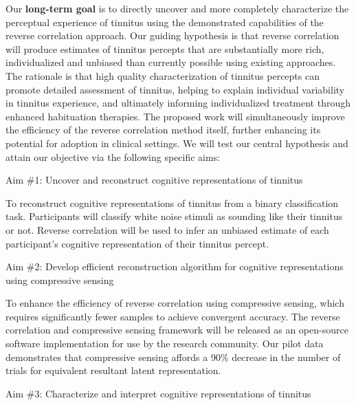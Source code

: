 \documentclass[11pt, notitlepage]{article} %
\begin{document}
Our \textbf{long-term goal} is to directly uncover and more completely characterize the perceptual experience of tinnitus using the demonstrated capabilities of the reverse correlation approach.
Our guiding hypothesis is that reverse correlation will produce estimates of tinnitus percepts that are substantially more rich, individualized and unbiased than currently possible using existing approaches. The rationale is that high quality characterization of tinnitus percepts can promote detailed assessment of tinnitus, helping to explain individual variability in tinnitus experience, and ultimately informing individualized treatment through enhanced habituation therapies. The proposed work will simultaneously improve the efficiency of the reverse correlation method itself, further enhancing its potential for adoption in clinical settings. We will test our central hypothesis and attain our objective via the following specific aims:

\begin{description}
	\item[Aim \#1: Uncover and reconstruct cognitive representations of tinnitus]{} 
\end{description}

To reconstruct cognitive representations of tinnitus from a binary classification task.
Participants will classify white noise stimuli as sounding like their tinnitus or not.
Reverse correlation will be used to infer an unbiased estimate of each participant's
cognitive representation of their tinnitus percept.

\begin{description}
	\item[Aim \#2: Develop efficient reconstruction algorithm for cognitive representations using compressive sensing]{} 
\end{description}

To enhance the efficiency of reverse correlation using compressive sensing,
which requires significantly fewer samples to achieve convergent accuracy.
The reverse correlation and compressive sensing framework will be released
as an open-source software implementation for use by the research community.
Our pilot data demonstrates that compressive sensing affords a 90\% decrease
in the number of trials for equivalent resultant latent representation.


\begin{description}
	\item[Aim \#3: Characterize and interpret cognitive representations of tinnitus]{} 
\end{description}
\end{document}
